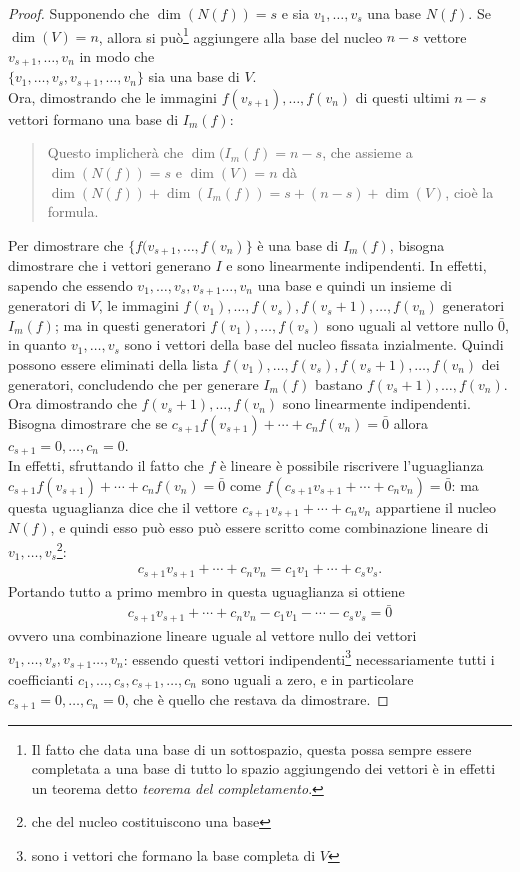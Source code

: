 \documentclass{book}
\theoremstyle{definition}
\theoremstyle{plain}
\begin{document}
\begin{proof}
  Supponendo che $\dim(N(f))=s$ e sia $v_1,\dots,v_s$ una base $N(f)$. Se $\dim(V)=n$, allora si
  può\footnote{Il fatto che data una base di un sottospazio, questa possa sempre essere completata
    a una base di tutto lo spazio aggiungendo dei vettori è in effetti un teorema detto \emph{teorema
      del completamento}.} aggiungere alla base del nucleo $n-s$ vettore $v_{s+1},\dots,v_n$ in modo
  che\\ $\{v_1,\dots,v_s,v_{s+1},\dots,v_n\}$ sia una base di $V$.\\
  Ora, dimostrando che le immagini $f(v_{s+1}),\dots,f(v_n)$ di questi ultimi $n-s$ vettori formano una
  base di $I_m(f)$:
  \begin{quote}
    Questo implicherà che $\dim(I_m(f)=n-s$, che assieme a $\dim(N(f))=s$ e $\dim(V)=n$ dà $\dim(N(f))+
    \dim(I_m(f))=s+(n-s)+\dim(V)$, cioè la formula.
  \end{quote}
  Per dimostrare che $\{f(v_{s+1},\dots,f(v_n)\}$ è una base di $I_m(f)$, bisogna dimostrare che i
  vettori generano $I$ e sono linearmente indipendenti. In effetti, sapendo che essendo $v_1,\dots,v_s,
  v_{s+1}\dots, v_n$ una base e quindi un insieme di generatori di $V$, le immagini $f(v_1),\dots,f(v_s),
  f(v_s+1),\dots,f(v_n)$ generatori $I_m(f)$; ma in questi generatori $f(v_1),\dots,f(v_s)$ sono uguali
  al vettore nullo $\bar{0}$, in quanto $v_1,\dots,v_s$ sono i vettori della base del nucleo fissata
  inzialmente. Quindi possono essere eliminati della lista $f(v_1),\dots,f(v_s), f(v_s+1),\dots,f(v_n)$
  dei generatori, concludendo che per generare $I_m(f)$ bastano $f(v_s+1),\dots,f(v_n)$.\\
  Ora dimostrando che $f(v_s+1),\dots,f(v_n)$ sono linearmente indipendenti. Bisogna dimostrare che se
  $c_{s+1}f(v_{s+1})+\cdots+c_nf(v_n)=\bar{0}$ allora $c_{s+1}=0,\dots,c_n=0$.\\
  In effetti, sfruttando il fatto che $f$ è lineare è possibile riscrivere l'uguaglianza
  $c_{s+1}f(v_{s+1})+\cdots+c_nf(v_n)=\bar{0}$ come $f(c_{s+1}v_{s+1}+\cdots+c_nv_n)=\bar{0}$: ma questa
  uguaglianza dice che il vettore $c_{s+1}v_{s+1}+\cdots+c_nv_n$ appartiene il nucleo $N(f)$, e quindi
  esso può esso può essere scritto come combinazione lineare di $v_1,\dots,v_s$\footnote{che
    del nucleo costituiscono una base}:
  \begin{eqnarray*}
    c_{s+1}v_{s+1}+\cdots+c_nv_n=c_1v_1+\cdots+c_sv_s.
  \end{eqnarray*}
  Portando tutto a primo membro in questa uguaglianza si ottiene
  \begin{eqnarray*}
    c_{s+1}v_{s+1}+\cdots+c_nv_n-c_1v_1-\cdots-c_sv_s=\bar{0}
  \end{eqnarray*}
  ovvero una combinazione lineare uguale al vettore nullo dei vettori $v_1,\dots,v_s, v_{s+1}\dots, v_n$:
  essendo questi vettori indipendenti\footnote{sono i vettori che formano la base completa di $V$}
  necessariamente tutti i coefficianti $c_1,\dots,c_s,c_{s+1},\dots,c_n$ sono uguali a zero, e in
  particolare $c_{s+1}=0,\dots,c_n=0$, che è quello che restava da dimostrare.
\end{proof}
\end{document}
